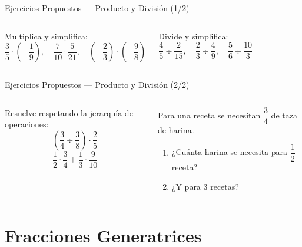 \documentclass[aspectratio=169]{beamer}
\begin{document}
\begin{frame}{Ejercicios Propuestos — Producto y División \textnormal{(1/2)}}
  \begin{columns}[T]
    \begin{mwejercicio}
      Multiplica y simplifica:
      \[
        \frac{3}{5} \cdot \left(-\frac{1}{9}\right),
        \quad
        \frac{7}{10} \cdot \frac{5}{21},
        \quad
        \left(-\frac{2}{3}\right) \cdot \left(-\frac{9}{8}\right)
      \]
    \end{mwejercicio}
    \begin{mwejercicio}
      Divide y simplifica:
      \[
        \frac{4}{5} \div \frac{2}{15},
        \quad
        \frac{2}{3} \div \frac{4}{9},
        \quad
        \frac{5}{6} \div \frac{10}{3}
      \]
    \end{mwejercicio}
  \end{columns}
\end{frame}

\begin{frame}{Ejercicios Propuestos — Producto y División \textnormal{(2/2)}}
  \begin{columns}[T]
    \begin{mwejercicio}
      Resuelve respetando la jerarquía de operaciones:
      \[
        \left(\frac{3}{4} \div \frac{3}{8}\right) \cdot \frac{2}{5}
      \]
      \[
        \frac{1}{2} \cdot \frac{3}{4} + \frac{1}{3} \cdot \frac{9}{10}
      \]
    \end{mwejercicio}
    \begin{mwejercicio}
      Para una receta se necesitan $\dfrac{3}{4}$ de taza de harina.
      \begin{enumerate}
        \item ¿Cuánta harina se necesita para $\dfrac{1}{2}$ receta?
        \item ¿Y para 3 recetas?
      \end{enumerate}
    \end{mwejercicio}
  \end{columns}
\end{frame}

\section{Fracciones Generatrices}
\end{document}
